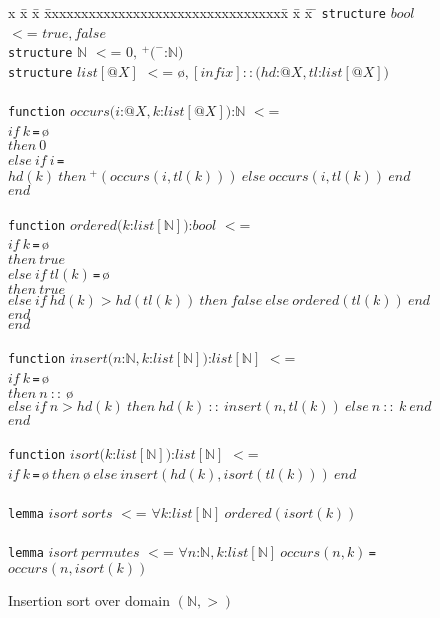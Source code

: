 \documentclass{article}
\theoremstyle{remark}
\theoremstyle{definition}
\newcommand{\iif}{\mathit{if}\ }
\newcommand{\ithen}{\mathit{then}\ }
\newcommand{\ielse}{\mathit{else}\ }
\newcommand{\iend}{\mathit{end}\ }
\newcommand{\ifalse}{\mathit{false}\ }
\newcommand{\itrue}{\mathit{true}\ }
\newcommand{\ieq}{\,\texttt{=}\,}
\newcommand{\itruef}{\mathit{true}}
\newcommand{\ifalsef}{\mathit{false}}
\newcommand{\nat}{\mathbb{N}}
\newcommand{\name}[1]{\mathit{#1}}
\begin{document}
\begin{figure}[t!]

\begin{tabbing}
x \= x \= x \= xxxxxxxxxxxxxxxxxxxxxxxxxxxxxxxx\= x \= x \= x \=\kill
\texttt{structure} $\name{bool}$ $<$= $\itruef, \ifalsef$ \\
\texttt{structure} $\nat$ $<$= $0,\, ^+(^-$:$\nat)$ \\
\texttt{structure} $\name{list}[@X]$ $<$= $\mbox{\o}, [\name{infix}]\name{::}(\name{hd}$:$@X, \name{tl}$:$\name{list}[@X])$ \\
\\
\texttt{function} $\name{occurs}(i$:$@X, k$:$\name{list}[@X])$:$\nat$ $<$=\\
$\iif k$\ieq$\mbox{\o}$ \\
\> $\ithen 0$\\
\> $\ielse \iif i$\ieq$\name{hd}(k)\ \ithen ^+(\name{occurs}(i, \name{tl}(k)))\ \ielse \name{occurs}(i, \name{tl}(k))\ \iend$ \\
$\iend$\\
\\
\texttt{function} $\name{ordered}(k$:$\name{list}[\nat])$:$\name{bool}$ $<$=\\
$\iif k$\ieq$\mbox{\o}$ \\
\> $\ithen \itrue$ \\
\> $\ielse \iif \name{tl}(k)$\ieq$\mbox{\o}$ \\
\> \> $\ithen \itrue$ \\
\> \> $\ielse \iif \name{hd}(k) > \name{hd}(\name{tl}(k))\ \ithen \ifalse \ielse \name{ordered}(\name{tl}(k))\ \iend$ \\
\> $\iend$ \\
$\iend$\\
\\
\texttt{function} $\name{insert}(n$:$\nat, k$:$\name{list}[\nat])$:$\name{list}[\nat]$ $<$= \\
$\iif k$\ieq$\mbox{\o}$ \\
\> $\ithen n\ \name{::}\ \mbox{\o}$ \\
\> $\ielse \iif n > \name{hd}(k)\ \ithen \name{hd}(k)\ \name{::}\ \name{insert}(n, \name{tl}(k))\ \ielse n\ \name{::}\ k\ \iend$ \\
$\iend$ \\
\\
\texttt{function} $\name{isort}(k$:$\name{list}[\nat])$:$\name{list}[\nat]$ $<$= \\
$\iif k$\ieq$\mbox{\o}\ \ithen \mbox{\o}\ \ielse \name{insert}(\name{hd}(k), \name{isort}(\name{tl}(k)))\ \iend$ \\
\\
\texttt{lemma} $\name{isort}\ \name{sorts}$ $<$= $\forall k$:$\name{list}[\nat]\ \name{ordered}(\name{isort}(k))$ \\
\\
\texttt{lemma} $\name{isort}\ \name{permutes}$ $<$= $\forall n$:$\nat, k$:$\name{list}[\nat]\ \name{occurs}(n,
k)$\ieq$\name{occurs}(n, \name{isort}(k))$
\end{tabbing}

\caption{Insertion sort over domain $(\nat,>)$} \label{fig:isort}
\end{figure}
\end{document}

